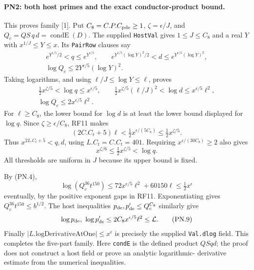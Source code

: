 \paragraph{PN2: both host primes and the exact conductor-product bound.}
This proves family [1]. Put $C_8=C.P.C_{\rm pde}\geq1$,
$\zeta=\epsilon/J$, and $Q_c=QS\,q\,d=\operatorname{condE}(D)$.
The supplied \texttt{HostVal} gives $1\leq J\leq C_8$ and a real $Y$
with $x^{1/J}\leq Y\leq x$. Its \texttt{PairRow} clauses say
\begin{gather*}
 e^{Y^{\epsilon/5}/2}<q\leq e^{Y^{\epsilon/5}},\qquad
 e^{Y^{\epsilon/5}(\log Y)^2/2}<d
                 \leq e^{Y^{\epsilon/5}(\log Y)^2},\\
 \log Q_c\leq2Y^{\epsilon/5}(\log Y)^2.
\end{gather*}
Taking logarithms, and using $\ell/J\leq\log Y\leq\ell$, proves
\begin{gather*}
 \tfrac12x^{\zeta/5}<\log q\leq x^{\epsilon/5},\qquad
 \tfrac12x^{\zeta/5}(\ell/J)^2<\log d
                                  \leq x^{\epsilon/5}\ell^2,\\
 \log Q_c\leq2x^{\epsilon/5}\ell^2.                         \tag{PN.6}
\end{gather*}
For $\ell\geq C_8$, the lower bound for $\log d$ is at least the
lower bound displayed for $\log q$. Since
$\zeta\geq\epsilon/C_8$, RF11 makes
\[
 (2C.C_t+5)\ell<\tfrac12x^{\epsilon/(5C_8)}
                                      \leq\tfrac12x^{\zeta/5}.
\]
Thus $x^{2L.C_t+5}<q,d$, using $L.C_t=C.C_t=401$.
Requiring $x^{\epsilon/(30C_8)}\geq2$ also gives
\[
 x^{\zeta/6}\leq\tfrac12x^{\zeta/5}<\log q.            \tag{PN.7}
\]
All thresholds are uniform in $J$ because its upper bound is fixed.

By (PN.4),
\[
 \log(Q_c^{36}t^{150})
 \leq72x^{\epsilon/5}\ell^2+60150\ell
 \leq\tfrac12x^\epsilon                                  \tag{PN.8}
\]
eventually, by the positive exponent gaps in RF11. Exponentiating
gives $Q_c^{36}t^{150}\leq b^{1/2}$. The host inequalities
$p_{\rm de},p'_{\rm de}\leq Q_c^{C_8}$ similarly give
\[
 \log p_{\rm de},\ \log p'_{\rm de}
       \leq2C_8x^{\epsilon/5}\ell^2\leq\mathcal L.       \tag{PN.9}
\]
Finally $|L.\mathrm{logDerivativeAtOne}|\leq x^\epsilon$ is precisely
the supplied \texttt{Val.dlog} field. This completes the five-part
family. Here \texttt{condE} is the defined product $QSqd$; the proof
does not construct a host field or prove an analytic logarithmic-
derivative estimate from the numerical inequalities.

